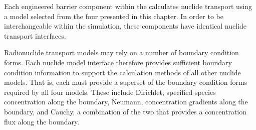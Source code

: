 Each engineered barrier component within the \Cyder calculates 
nuclide transport using a model selected from the four presented in this 
chapter. In order to be interchangeable within the simulation, these components 
have identical nuclide transport interfaces.  

Radionuclide transport models may rely on a number of boundary condition forms.  
Each nuclide model interface therefore provides sufficient boundary condition 
information to support the calculation methods of all other nuclide models. That 
is, each must provide a superset of the boundary condition forms required by all 
four models. These include Dirichlet, specified species concentration along the 
boundary, Neumann, concentration gradients along the boundary, and Cauchy, a 
combination of the two that provides a concentration flux along the boundary.

